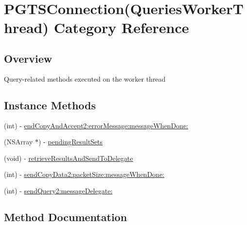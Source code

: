 \hypertarget{category_p_g_t_s_connection_07_queries_worker_thread_08}{}\section{P\+G\+T\+S\+Connection(Queries\+Worker\+Thread) Category Reference}
\label{category_p_g_t_s_connection_07_queries_worker_thread_08}


\subsection{Overview}
Query-\/related methods executed on the worker thread \subsection*{Instance Methods}
\begin{DoxyCompactItemize}
\item 
(int) -\/ \hyperlink{category_p_g_t_s_connection_07_queries_worker_thread_08_af80b6820e2e507e803f2f011bbae3c99}{end\+Copy\+And\+Accept2\+:error\+Message\+:message\+When\+Done\+:}
\item 
(N\+S\+Array $\ast$) -\/ \hyperlink{category_p_g_t_s_connection_07_queries_worker_thread_08_a197a23fee041660cbacb5398d1eb46ed}{pending\+Result\+Sets}
\item 
(void) -\/ \hyperlink{category_p_g_t_s_connection_07_queries_worker_thread_08_a57a45776d9bde345c877f7126bf8d52d}{retrieve\+Results\+And\+Send\+To\+Delegate}
\item 
(int) -\/ \hyperlink{category_p_g_t_s_connection_07_queries_worker_thread_08_a4a7d18e07e3280f24111c371e435d9ab}{send\+Copy\+Data2\+:packet\+Size\+:message\+When\+Done\+:}
\end{DoxyCompactItemize}
{\bf }\par
\begin{DoxyCompactItemize}
\item 
(int) -\/ \hyperlink{category_p_g_t_s_connection_07_queries_worker_thread_08_abd70fb6ce175a5fb0be26aae29e0e6af}{send\+Query2\+:message\+Delegate\+:}
\end{DoxyCompactItemize}



\subsection{Method Documentation}
\hypertarget{category_p_g_t_s_connection_07_queries_worker_thread_08_af80b6820e2e507e803f2f011bbae3c99}{}
